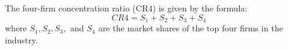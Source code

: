 \documentclass{article}
\begin{document}
The four-firm concentration ratio (CR4) is given by the formula:
\[
CR4 = S_1 + S_2 + S_3 + S_4
\]
where \( S_1, S_2, S_3, \) and \( S_4 \) are the market shares of the top four firms in the industry.
\end{document}
